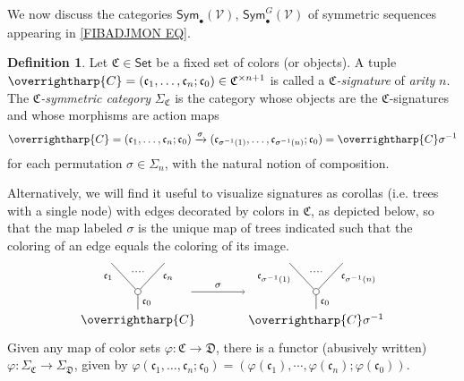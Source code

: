 \documentclass[a4paper,10pt
,draft
]{article}%
\numberwithin{equation}{section}
\numberwithin{figure}{section}
\theoremstyle{definition} %
\newtheorem{definition}[equation]{Definition}%
\newcommand{\vect}[1]{\text{\overrightharp{\ensuremath{#1}}}}
\newcommand{\V}{\ensuremath{\mathcal V}}
\newcommand{\1}{\ensuremath{\mathbbm 1}}%
\begin{document}
We now discuss the categories
$\mathsf{Sym}_{\bullet}(\V)$,
$\mathsf{Sym}^G_{\bullet}(\V)$
of symmetric sequences appearing in \eqref{FIBADJMON EQ}.


\begin{definition}\label{CSYM DEF}
	Let $\mathfrak {C} \in \mathsf{Set}$ be a fixed set of colors (or objects).
	A tuple
	$\vect C = (\mathfrak c_1, \dots, \mathfrak c_n; \mathfrak c_0) \in \mathfrak{C}^{\times n+1}$
	is called a \textit{$\mathfrak {C}$-signature} of \textit{arity} $n$.
	The \textit{$\mathfrak C$-symmetric category} $\Sigma_{\mathfrak C}$ is the category whose objects are the $\mathfrak{C}$-signatures and whose morphisms are action maps
	\begin{equation}\label{CSYM EQ1}
	\vect{C} =
	(\mathfrak c_1, \dots, \mathfrak c_n; \mathfrak c_0) \xrightarrow{\sigma} (\mathfrak c_{\sigma^{-1}(1)}, \dots, \mathfrak c_{\sigma^{-1}(n)}; \mathfrak c_0)
	= \vect{C} \sigma^{-1}
	\end{equation}
	for each permutation $\sigma \in \Sigma_n$, with the natural notion of composition.
	
	Alternatively, we will find it useful to visualize signatures as corollas (i.e. trees with a single node)
	with edges decorated by colors in $\mathfrak{C}$, as depicted below, so that the map labeled $\sigma$
	is the unique map of trees indicated such that the coloring of an edge equals the coloring of its image.
	\begin{equation}\label{CSYM EQ2}
	\begin{tikzpicture}
	[grow=up,auto,level distance=2.3em,every node/.style = {font=\footnotesize},dummy/.style={circle,draw,inner sep=0pt,minimum size=1.75mm}]
	
	\node at (0,0) [font=\normalsize]{$\vect{C}$}
	child{node [dummy] {}
		child{
			edge from parent node [swap,near end] {$\mathfrak c_n$} node [name=Kn] {}}
		child{
			edge from parent node [near end] {$\mathfrak c_1$}
			node [name=Kone,swap] {}}
		edge from parent node [swap] {$\mathfrak c_0$}
	};
	\draw [dotted,thick] (Kone) -- (Kn) ;
	\node at (5,0) [font=\normalsize] {$\vect{C} \sigma^{-1}
		$}
	child{node [dummy] {}
		child{
			edge from parent node [swap,near end] {$\mathfrak c_{\sigma^{-1}(n)}$} node [name=Kn] {}}
		child{
			edge from parent node [near end] {$\mathfrak c_{\sigma^{-1}(1)}$}
			node [name=Kone,swap] {}}
		edge from parent node [swap] {$\mathfrak c_0$}
	};
	\draw [dotted,thick] (Kone) -- (Kn) ;
	
	\draw[->] (1.5,0.8) -- node{$\sigma$} (3,0.8);
	\end{tikzpicture}
	\end{equation}
	Given any map of color sets $\varphi \colon \mathfrak{C} \to \mathfrak{D}$,
	there is a functor (abusively written)
	$\varphi \colon \Sigma_{\mathfrak{C}} \to \Sigma_{\mathfrak{D}}$,
	given by 
	$\varphi (\mathfrak c_1, \dots, \mathfrak c_n; \mathfrak c_0) = (\varphi(\mathfrak c_1),\cdots,\varphi(\mathfrak c_n);\varphi(\mathfrak c_0))$. 
\end{definition}
\end{document}
